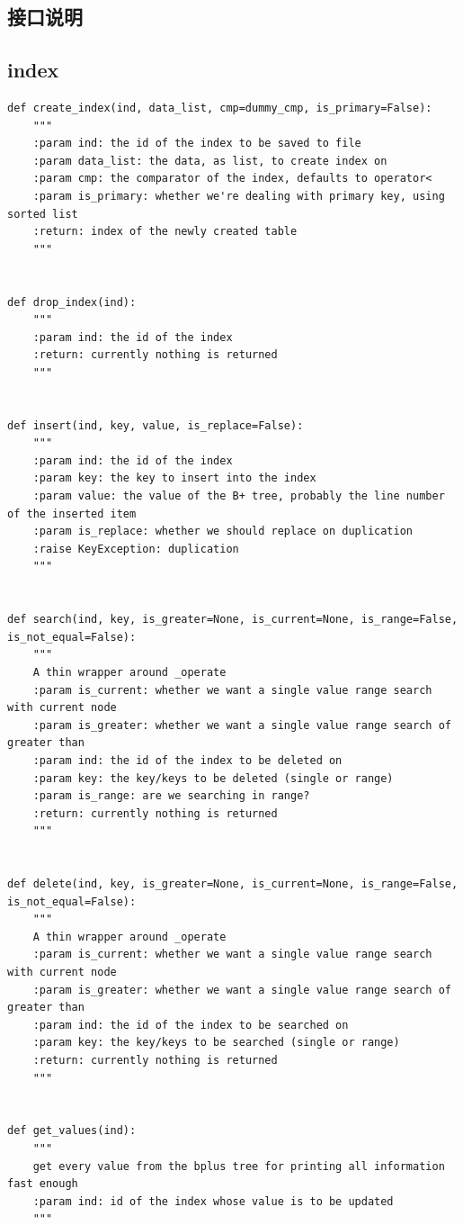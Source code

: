 \documentclass[UTF8]{ctexrep} %
\newenvironment{longlisting}{\captionsetup{type=listing}}{}
\begin{document}
\begin{appendices}
\chapter{接口说明}
\section{index}
\begin{longlisting}
    \begin{verbatim}
def create_index(ind, data_list, cmp=dummy_cmp, is_primary=False):
    """
    :param ind: the id of the index to be saved to file
    :param data_list: the data, as list, to create index on
    :param cmp: the comparator of the index, defaults to operator<
    :param is_primary: whether we're dealing with primary key, using sorted list
    :return: index of the newly created table
    """


def drop_index(ind):
    """
    :param ind: the id of the index
    :return: currently nothing is returned
    """


def insert(ind, key, value, is_replace=False):
    """
    :param ind: the id of the index
    :param key: the key to insert into the index
    :param value: the value of the B+ tree, probably the line number of the inserted item
    :param is_replace: whether we should replace on duplication
    :raise KeyException: duplication
    """


def search(ind, key, is_greater=None, is_current=None, is_range=False, is_not_equal=False):
    """
    A thin wrapper around _operate
    :param is_current: whether we want a single value range search with current node
    :param is_greater: whether we want a single value range search of greater than
    :param ind: the id of the index to be deleted on
    :param key: the key/keys to be deleted (single or range)
    :param is_range: are we searching in range?
    :return: currently nothing is returned
    """


def delete(ind, key, is_greater=None, is_current=None, is_range=False, is_not_equal=False):
    """
    A thin wrapper around _operate
    :param is_current: whether we want a single value range search with current node
    :param is_greater: whether we want a single value range search of greater than
    :param ind: the id of the index to be searched on
    :param key: the key/keys to be searched (single or range)
    :return: currently nothing is returned
    """


def get_values(ind):
    """
    get every value from the bplus tree for printing all information fast enough
    :param ind: id of the index whose value is to be updated
    """



\end{verbatim}
\end{longlisting}
\end{appendices}
\end{document}
